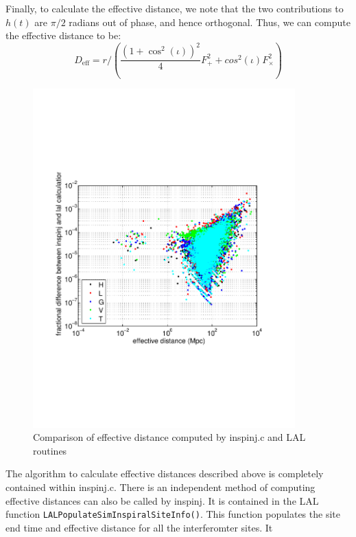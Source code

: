 \begin{entry}
Finally, to calculate the effective distance, we note that the two contributions
to $h(t)$ are $\pi/2$ radians out of phase, and hence orthogonal.  Thus, we can
compute the effective distance to be:
%
\begin{equation}
  D_{\mathrm{eff}} = r / \left( \frac{ (1 + \cos^2(\iota))^2 }{4} F_{+}^{2} +
      cos^{2}(\iota) F_{\times}^{2} \right)
\end{equation}      
%
\begin{figure}
\begin{center}
\includegraphics[width=0.9\textwidth]{figures/effective_distance_comparison}
\caption{Comparison of effective distance computed by inspinj.c and LAL
routines}
\label{fig:eff_dist_comparison}
\end{center}
\end{figure}
%
The algorithm to calculate effective distances described above is completely
contained within inspinj.c.  There is an independent method of computing
effective distances can also be called by inspinj.  It is contained in the LAL
function \texttt{LALPopulateSimInspiralSiteInfo()}.  This function populates
the site end time and effective distance for all the interferomter sites.  It

\end{entry}
